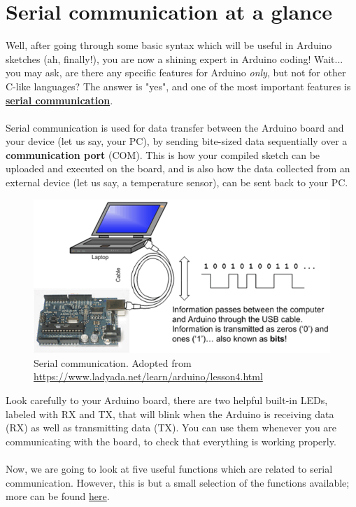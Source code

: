 \documentclass{article}
\begin{document}
\section{Serial communication at a glance}
Well, after going through some basic syntax which will be useful in Arduino sketches (ah, finally!), you are now a shining expert in Arduino coding! Wait... you may ask, are there any specific features for Arduino \textit{only}, but not for other C-like languages? The answer is "yes", and one of the most important features is \href{https://en.wikipedia.org/wiki/Serial_communication}{\textbf{serial communication}}.\\\\
Serial communication is used for data transfer between the Arduino board and your device (let us say, your PC), by sending bite-sized data sequentially over a \textbf{communication port} (COM). This is how your compiled sketch can be uploaded and executed on the board, and is also how the data collected from an external device (let us say, a temperature sensor), can be sent back to your PC.
\begin{figure}[H]
    \centering
    \includegraphics[width=.6\textwidth]{serialdata.png}
    \caption{Serial communication. Adopted from \href{https://www.ladyada.net/learn/arduino/lesson4.html}{https://www.ladyada.net/learn/arduino/lesson4.html}}
\end{figure}
\noindent Look carefully to your Arduino board, there are two helpful built-in LEDs, labeled with RX and TX, that will blink when the Arduino is receiving data (RX) as well as transmitting data (TX). You can use them whenever you are communicating with the board, to check that everything is working properly.\\\\
Now, we are going to look at five useful functions which are related to serial communication. However, this is but a small selection of the functions available; more can be found \href{https://www.arduino.cc/reference/en/language/functions/communication/serial/}{here}.
\end{document}
